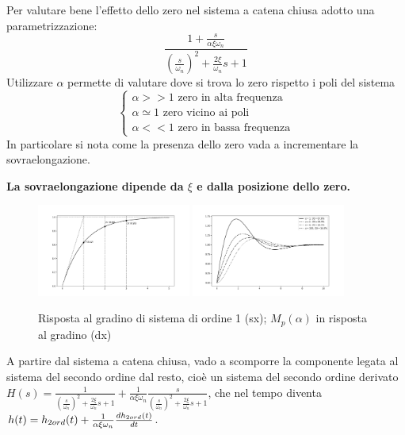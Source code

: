Per valutare bene l'effetto dello zero nel sistema a catena chiusa adotto una parametrizzazione:
\[\frac{1+\frac{s}{\alpha \xi \omega_n}}{\left(\frac{s}{\omega_n}\right)^2+\frac{2\xi}{\omega_n}s+1}\]
Utilizzare \(\alpha\) permette di valutare dove si trova lo zero rispetto i poli del sistema
\[
\begin{cases}
\alpha >> 1 \text{ \ zero in alta frequenza} \\
\alpha \simeq 1 \text{ \ zero vicino ai poli} \\
\alpha << 1 \text{ \ zero in bassa frequenza}
\end{cases}
\]
In particolare si nota come la presenza dello zero vada a incrementare la sovraelongazione.

\textbf{La sovraelongazione dipende da \(\xi\) e dalla posizione dello zero.}

\begin{figure}[h]
    \centering
    \includegraphics[width=0.45\textwidth]{Immagini/risposta_gradino_ord1_tempo.png}
    \includegraphics[width=0.45\textwidth]{Immagini/influenza_zero_su_sovraelong.png}
    \caption{Risposta al gradino di sistema di ordine 1 (sx); \(M_p(\alpha)\) in risposta al gradino (dx)}
\end{figure}

A partire dal sistema a catena chiusa, vado a scomporre la componente legata al sistema del secondo ordine dal resto, cioè un sistema del secondo ordine derivato \(H(s)=\frac{1}{\left(\frac{s}{\omega_n}\right)^2+\frac{2\xi}{\omega_n}s+1} + \frac{1}{\alpha \xi \omega_n}\frac{s}{\left(\frac{s}{\omega_n}\right)^2+\frac{2\xi}{\omega_n}s+1}\), che nel tempo diventa \(h(t)=h_{2 ord}(t) + \frac{1}{\alpha \xi \omega_n} \frac{dh_{2 ord}(t)}{dt}\).

